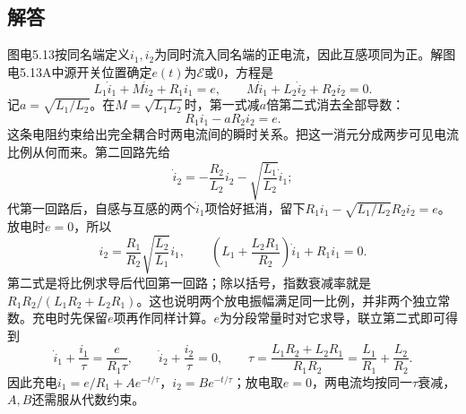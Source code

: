 \documentclass[UTF8,fontset=fandol,a4paper,11pt]{ctexart}
\newcommand{\figcaption}[1]{\par\vspace{2pt}{\small\color{muted}#1}\par}
\begin{document}
\begin{center}
\begin{minipage}{.98\linewidth}
\figcaption{图电5.13\quad 电流同时流入同名端，互感项取同号}
\end{minipage}\end{center}

\subsection*{解答}


图电5.13按同名端定义$i_1,i_2$为同时流入同名端的正电流，因此互感项同为正。解图电5.13A中源开关位置确定$e(t)$为$\mathcal E$或$0$，方程是
\[
 L_1\dot i_1+M\dot i_2+R_1i_1=e,\qquad
 M\dot i_1+L_2\dot i_2+R_2i_2=0.
\]
记$a=\sqrt{L_1/L_2}$。在$M=\sqrt{L_1L_2}$时，第一式减$a$倍第二式消去全部导数：
\[
 \boxed{R_1i_1-aR_2i_2=e.}
\]
这条电阻约束给出完全耦合时两电流间的瞬时关系。把这一消元分成两步可见电流比例从何而来。第二回路先给
\[
\dot i_2=-\frac{R_2}{L_2}i_2-\sqrt{\frac{L_1}{L_2}}\dot i_1;
\]
代第一回路后，自感与互感的两个$\dot i_1$项恰好抵消，留下$R_1i_1-\sqrt{L_1/L_2}R_2i_2=e$。放电时$e=0$，所以
\[
i_2=\frac{R_1}{R_2}\sqrt{\frac{L_2}{L_1}}i_1,\qquad
\left(L_1+\frac{L_2R_1}{R_2}\right)\dot i_1+R_1i_1=0.
\]
第二式是将比例求导后代回第一回路；除以括号，指数衰减率就是$R_1R_2/(L_1R_2+L_2R_1)$。这也说明两个放电振幅满足同一比例，并非两个独立常数。充电时先保留$e$项再作同样计算。$e$为分段常量时对它求导，联立第二式即可得到
\[
 \dot i_1+\frac{i_1}{\tau}=\frac e{R_1\tau},
 \qquad \dot i_2+\frac{i_2}{\tau}=0,\qquad
 \boxed{\tau=\frac{L_1R_2+L_2R_1}{R_1R_2}
 =\frac{L_1}{R_1}+\frac{L_2}{R_2}.}
\]
因此充电$i_1=e/R_1+A e^{-t/\tau}$，$i_2=B e^{-t/\tau}$；放电取$e=0$，两电流均按同一$\tau$衰减，$A,B$还需服从代数约束。
\end{document}
